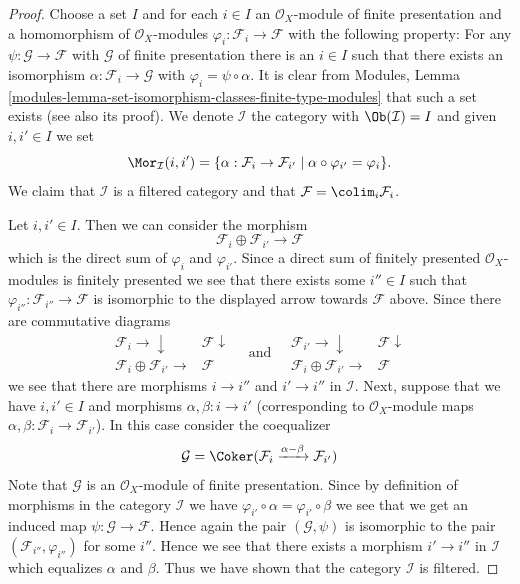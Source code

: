 \begin{proof}

Choose a set $I$ and for each $i \in I$ an $\mathcal{O}_X$-module
of finite presentation and a homomorphism of $\mathcal{O}_X$-modules
$\varphi_i : \mathcal{F}_i \to \mathcal{F}$ with the following
property: For any $\psi : \mathcal{G} \to \mathcal{F}$ with $\mathcal{G}$
of finite presentation there is an $i \in I$ such that there exists
an isomorphism $\alpha : \mathcal{F}_i \to \mathcal{G}$ with
$\varphi_i = \psi \circ \alpha$. It is clear from
Modules, Lemma \ref{modules-lemma-set-isomorphism-classes-finite-type-modules}
that such a set exists (see also its proof).
We denote $\mathcal{I}$ the category
with $\Ob(\mathcal{I}) = I$ and given $i, i' \in I$
we set
$$
\Mor_\mathcal{I}(i, i') =
\{\alpha : \mathcal{F}_i \to \mathcal{F}_{i'} \mid
\alpha \circ \varphi_{i'} = \varphi_i
\}.
$$
We claim that $\mathcal{I}$ is a filtered category and that
$\mathcal{F} = \colim_i \mathcal{F}_i$.

\medskip\noindent
Let $i, i' \in I$. Then we can consider the morphism
$$
\mathcal{F}_i \oplus \mathcal{F}_{i'} \longrightarrow \mathcal{F}
$$
which is the direct sum of $\varphi_i$ and $\varphi_{i'}$.
Since a direct sum of finitely presented $\mathcal{O}_X$-modules
is finitely presented we see that there exists some $i'' \in I$
such that $\varphi_{i''} : \mathcal{F}_{i''} \to \mathcal{F}$
is isomorphic to the displayed arrow towards $\mathcal{F}$ above.
Since there are commutative diagrams
$$
\begin{array}{cc}\mathcal{F}_i \longrightarrow\downarrow & \mathcal{F} \downarrow \\ \mathcal{F}_i \oplus \mathcal{F}_{i'} \longrightarrow & \mathcal{F}\end{array}
\quad
\text{and}
\quad
\begin{array}{cc}\mathcal{F}_{i'} \longrightarrow\downarrow & \mathcal{F} \downarrow \\ \mathcal{F}_i \oplus \mathcal{F}_{i'} \longrightarrow & \mathcal{F}\end{array}
$$
we see that there are morphisms $i \to i''$ and $i' \to i''$
in $\mathcal{I}$. Next, suppose that we have $i, i' \in I$ and
morphisms $\alpha, \beta : i \to i'$ (corresponding to $\mathcal{O}_X$-module
maps $\alpha, \beta : \mathcal{F}_i \to \mathcal{F}_{i'}$).
In this case consider the coequalizer
$$
\mathcal{G} =
\Coker(
\mathcal{F}_i \xrightarrow{\alpha - \beta} \mathcal{F}_{i'}
)
$$
Note that $\mathcal{G}$ is an $\mathcal{O}_X$-module of finite presentation.
Since by definition of morphisms in the category $\mathcal{I}$
we have $\varphi_{i'} \circ \alpha = \varphi_{i'} \circ \beta$
we see that we get an induced map $\psi : \mathcal{G} \to \mathcal{F}$.
Hence again the pair $(\mathcal{G}, \psi)$ is isomorphic to
the pair $(\mathcal{F}_{i''}, \varphi_{i''})$ for some $i''$.
Hence we see that there exists a morphism $i' \to i''$ in
$\mathcal{I}$ which equalizes $\alpha$ and $\beta$. Thus we have
shown that the category $\mathcal{I}$ is filtered.


\end{proof}

